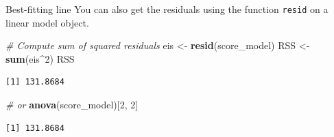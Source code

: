 \documentclass[
  ignorenonframetext,
]{beamer}
\newenvironment{Shaded}{\begin{snugshade}}{\end{snugshade}}
\newcommand{\CommentTok}[1]{\textcolor[rgb]{0.56,0.35,0.01}{\textit{#1}}}
\newcommand{\DecValTok}[1]{\textcolor[rgb]{0.00,0.00,0.81}{#1}}
\newcommand{\FunctionTok}[1]{\textcolor[rgb]{0.13,0.29,0.53}{\textbf{#1}}}
\newcommand{\NormalTok}[1]{#1}
\newcommand{\OtherTok}[1]{\textcolor[rgb]{0.56,0.35,0.01}{#1}}
\newcommand{\SpecialCharTok}[1]{\textcolor[rgb]{0.81,0.36,0.00}{\textbf{#1}}}
\begin{document}
\begin{frame}[fragile]{Best-fitting line}
\label{best-fitting-line-4}
You can also get the residuals using the function \texttt{resid} on a
linear model object.

\normalsize

\begin{Shaded}
\begin{Highlighting}[]
\CommentTok{\# Compute sum of squared residuals}
\NormalTok{eis }\OtherTok{\textless{}{-}} \FunctionTok{resid}\NormalTok{(score\_model)}
\NormalTok{RSS }\OtherTok{\textless{}{-}} \FunctionTok{sum}\NormalTok{(eis}\SpecialCharTok{\^{}}\DecValTok{2}\NormalTok{)}
\NormalTok{RSS}
\end{Highlighting}
\end{Shaded}

\begin{verbatim}
[1] 131.8684
\end{verbatim}

\begin{Shaded}
\begin{Highlighting}[]
\CommentTok{\# or}
\FunctionTok{anova}\NormalTok{(score\_model)[}\DecValTok{2}\NormalTok{, }\DecValTok{2}\NormalTok{]}
\end{Highlighting}
\end{Shaded}

\begin{verbatim}
[1] 131.8684
\end{verbatim}

\normalsize
\end{frame}
\end{document}
